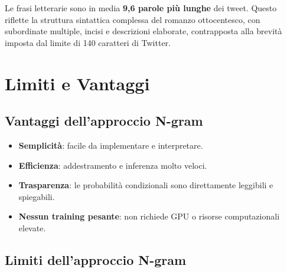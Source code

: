 \documentclass[12pt, a4paper]{article}
\begin{document}
Le frasi letterarie sono in media \textbf{9,6 parole più lunghe} dei
tweet. Questo riflette la struttura sintattica complessa del romanzo
ottocentesco, con subordinate multiple, incisi e descrizioni elaborate,
contrapposta alla brevità imposta dal limite di 140 caratteri di Twitter.

\section{Limiti e Vantaggi}

\subsection{Vantaggi dell'approccio N-gram}

\begin{itemize}
    \item \textbf{Semplicità}: facile da implementare e interpretare.
    \item \textbf{Efficienza}: addestramento e inferenza molto veloci.
    \item \textbf{Trasparenza}: le probabilità condizionali sono
          direttamente leggibili e spiegabili.
    \item \textbf{Nessun training pesante}: non richiede GPU o
          risorse computazionali elevate.
\end{itemize}

\subsection{Limiti dell'approccio N-gram}
\end{document}
